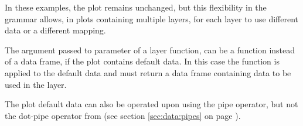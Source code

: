\documentclass[krantz2]{krantz}\usepackage{knitr}
\begin{document}
In these examples, the plot remains unchanged, but this flexibility in the grammar allows, in plots containing multiple layers, for each layer to use different data or a different mapping.

\begin{explainbox}
The argument passed to parameter  of a layer function, can be a function instead of a data frame, if the plot contains default data. In this case the function is applied to the default data and must return a data frame containing data to be used in the layer.

\begin{knitrout}\footnotesize
{}\color{fgcolor}\begin{kframe}
\begin{alltt}
\hlstd{(} 
        \hlstd{=} \hlstd{(}    \hlopt{+}
  \hlstd{(} \hlstd{=} \hlstd{)} \hlopt{+}
  \hlstd{(} \hlstd{=} \hlstd{(}\hlstd{)\{} \hlopt{==} \hlstd{)\},}  \hlstd{=} \hlstd{,}  \hlstd{=} \hlstd{)}
\end{alltt}
\end{kframe}
\end{knitrout}

The plot default data can also be operated upon using the  pipe operator, but not the dot-pipe operator from  (see section \ref{sec:data:pipes} on page \pageref{sec:data:pipes}).
\begin{knitrout}\footnotesize
{}\color{fgcolor}
\end{knitrout}

\end{explainbox}
\end{document}
